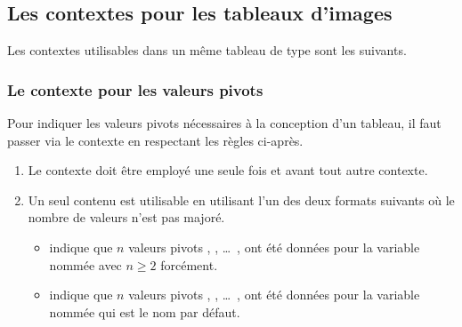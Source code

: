 \documentclass[10pt, a4paper]{article}
\begin{document}

\subsection{Les contextes pour les tableaux d'images}

Les contextes utilisables dans un même tableau de type  sont les suivants.

\medskip

\begin{itemize*}[before = \leavevmode\kern15pt, itemjoin = \kern15pt]
	\item {}

	\item {}
\end{itemize*}




\subsubsection{Le contexte  pour les valeurs pivots}
\label{tns-math-functab-dsl-l3-ctxt-bounds}

Pour indiquer les valeurs pivots nécessaires à la conception d'un tableau, il faut passer via le contexte  en respectant les règles ci-après.
%
\begin{enumerate}
    \item Le contexte  doit être employé une seule fois et avant tout autre contexte.


    \item Un seul contenu est utilisable en utilisant l'un des deux formats suivants où le nombre de valeurs n'est pas majoré.
    \begin{itemize}
        \item {} indique que $n$ valeurs pivots  ,  , \dots\ ,  ont été données pour la variable nommée  avec $n \geq 2$ forcément.

        \item {} indique que $n$ valeurs pivots  ,  , \dots\ ,  ont été données pour la variable nommée  qui est le nom par défaut.
    \end{itemize}
\end{enumerate}
\end{document}
